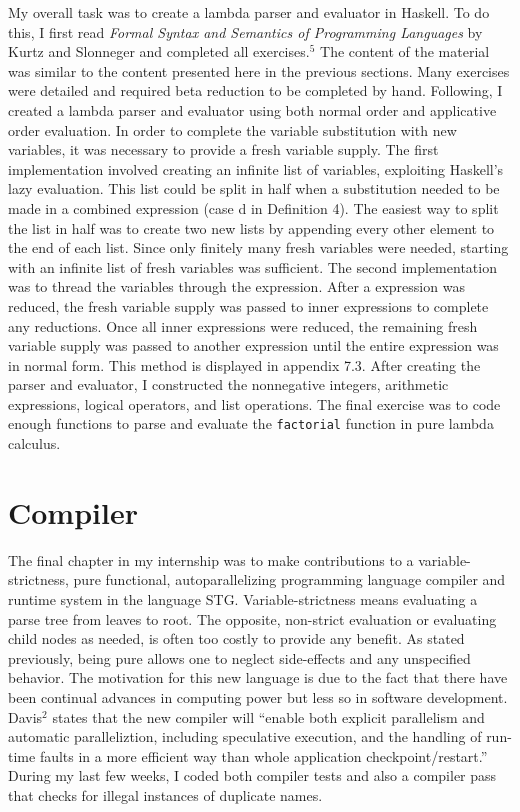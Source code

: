 \documentclass[11pt]{article}
\begin{document}
My overall task was to create a lambda parser and evaluator in Haskell. To
do this, I first read \textit{Formal Syntax and Semantics of Programming Languages} by Kurtz and Slonneger and completed all exercises.$^5$  The
content of the material was similar to the content presented here in the
previous sections. Many exercises were detailed and required beta
reduction to be completed by hand. Following, I created a lambda parser and
evaluator using both normal order and applicative order evaluation. In
order to complete the variable substitution with new variables, it was
necessary to provide a fresh variable supply. The first implementation
involved creating an infinite list of variables, exploiting Haskell's lazy
evaluation. This list could be split in half when a substitution needed to
be made in a combined expression (case d in Definition 4). The easiest way
to split the list in half was to create two new lists by appending every
other element to the end of each list. Since only finitely many fresh
variables were needed, starting with an infinite list of fresh variables
was sufficient. The second implementation was to thread the variables
through the expression. After a expression was reduced, the fresh variable
supply was passed to inner expressions to complete any reductions. Once all
inner expressions were reduced, the remaining fresh variable supply was
passed to another expression until the entire expression was in normal
form. This method is displayed in appendix 7.3. After creating the parser
and evaluator, I constructed the nonnegative integers, arithmetic
expressions, logical operators, and list operations. The final exercise was
to code enough functions to parse and evaluate the \texttt{factorial} function in pure
lambda calculus.

\section{Compiler}

The final chapter in my internship was to make contributions to a
variable-strictness, pure functional, autoparallelizing programming language
compiler and runtime system in the language STG. Variable-strictness means
evaluating a parse tree from leaves to root. The opposite, non-strict evaluation or
evaluating child nodes as needed, is often too costly to provide any benefit. As
stated previously, being pure allows one to neglect side-effects and any unspecified behavior. The motivation for this new language is due
to the fact that there have been continual advances in computing power but
less so in software development. Davis$^2$  states that the new compiler will ``enable both explicit
parallelism and automatic paralleliztion, including speculative execution, and
the handling of run-time faults in a more efficient way than whole application
checkpoint/restart.'' During my last few weeks, I coded both compiler tests and also a compiler pass that checks for illegal instances of duplicate names.
\end{document}
